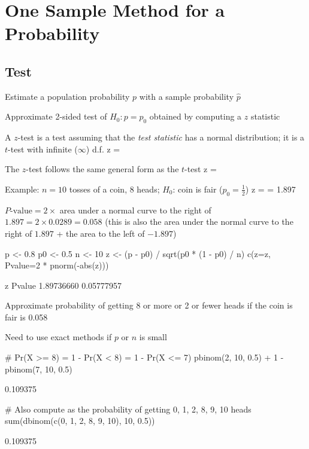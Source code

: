 \section{One Sample Method for a Probability} 
\subsection{Test}
\bi
\item Estimate a population probability $p$ with a sample probability
  $\hat{p}$
\item Approximate 2-sided test of $H_{0}: p=p_{0}$ obtained by
  computing a $z$ statistic
\item A $z$-test is a test assuming that the \emph{test statistic} has
  a normal distribution; it is a $t$-test with infinite ($\infty$) d.f.
\beq
z = 
\eeq
\item The $z$-test follows the same general form as the $t$-test
\beq
z = 
\eeq
\item Example: $n=10$ tosses of a coin, 8 heads; $H_{0}$: coin is fair
  ($p_{0}=\frac{1}{2}$)
\beq
z =  = 1.897
\eeq
\item $P\textrm{-value} = 2 \times$ area under a normal curve to the right of $1.897 =
  2 \times 0.0289 = 0.058$ (this is also the area under the normal
  curve to the right of $1.897$ + the area to the left of $-1.897$)
\begin{Schunk}
\begin{Sinput}
p  <- 0.8
p0 <- 0.5
n  <- 10
z  <- (p - p0) / sqrt(p0 * (1 - p0) / n)
c(z=z, Pvalue=2 * pnorm(-abs(z)))
\end{Sinput}
\begin{Soutput}
         z     Pvalue 
1.89736660 0.05777957 
\end{Soutput}
\end{Schunk}
\item Approximate probability of getting 8 or more or 2 or fewer heads
  if the coin is fair is 0.058
\item Need to use exact methods if $p$ or $n$ is small
\begin{Schunk}
\begin{Sinput}
# Pr(X >= 8) = 1 - Pr(X < 8) = 1 - Pr(X <= 7)
pbinom(2, 10, 0.5) + 1 - pbinom(7, 10, 0.5)
\end{Sinput}
\begin{Soutput}
[1] 0.109375
\end{Soutput}
\begin{Sinput}
# Also compute as the probability of getting 0, 1, 2, 8, 9, 10 heads
sum(dbinom(c(0, 1, 2, 8, 9, 10), 10, 0.5))
\end{Sinput}
\begin{Soutput}
[1] 0.109375
\end{Soutput}
\end{Schunk}
\ei

